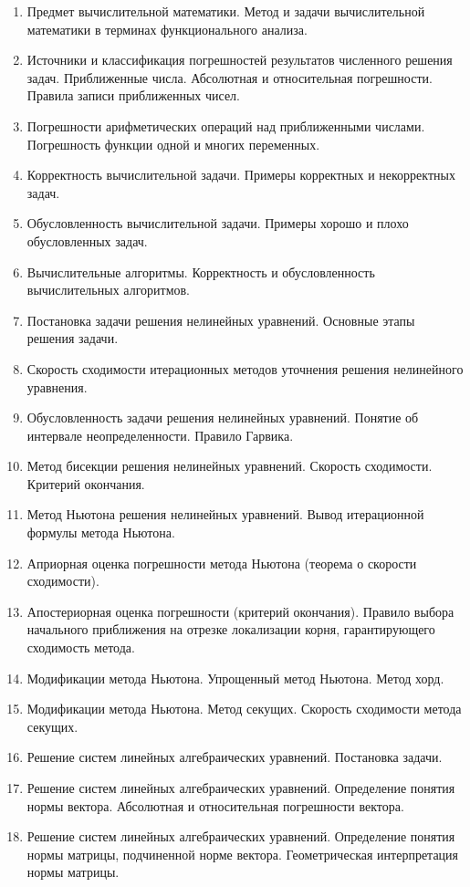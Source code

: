 \documentclass[14pt]{extarticle}
\begin{document}
\begin{enumerate}
    \item Предмет вычислительной математики. Метод и задачи вычислительной математики в терминах функционального анализа. 
    \item Источники и классификация погрешностей результатов численного решения задач. Приближенные числа. Абсолютная и относительная погрешности. Правила записи приближенных чисел. 
    \item Погрешности арифметических операций над приближенными числами. Погрешность функции одной и многих переменных. 
    \item Корректность вычислительной задачи. Примеры корректных и некорректных задач. 
    \item Обусловленность вычислительной задачи. Примеры хорошо и плохо обусловленных задач. 
    \item Вычислительные алгоритмы. Корректность и обусловленность вычислительных алгоритмов. 
    \item Постановка задачи решения нелинейных уравнений. Основные этапы решения задачи. 
    \item Скорость сходимости итерационных методов уточнения решения нелинейного уравнения. 
    \item Обусловленность задачи решения нелинейных уравнений. Понятие об интервале неопределенности. Правило Гарвика. 
    \item Метод бисекции решения нелинейных уравнений. Скорость сходимости. Критерий окончания. 
    \item Метод Ньютона решения нелинейных уравнений. Вывод итерационной формулы метода Ньютона. 
    \item Априорная оценка погрешности метода Ньютона (теорема о скорости сходимости). 
    \item Апостериорная оценка погрешности (критерий окончания). Правило выбора начального приближения на отрезке локализации корня, гарантирующего сходимость метода. 
    \item Модификации метода Ньютона. Упрощенный метод Ньютона. Метод хорд. 
    \item Модификации метода Ньютона. Метод секущих. Скорость сходимости метода секущих. 
    \item Решение систем линейных алгебраических уравнений.  Постановка задачи. 
    \item Решение систем линейных алгебраических уравнений.  Определение понятия нормы вектора. Абсолютная и относительная погрешности вектора. 
    \item Решение систем линейных алгебраических уравнений.  Определение понятия нормы матрицы, подчиненной норме вектора. Геометрическая интерпретация нормы матрицы. 

\end{enumerate}
\end{document}
